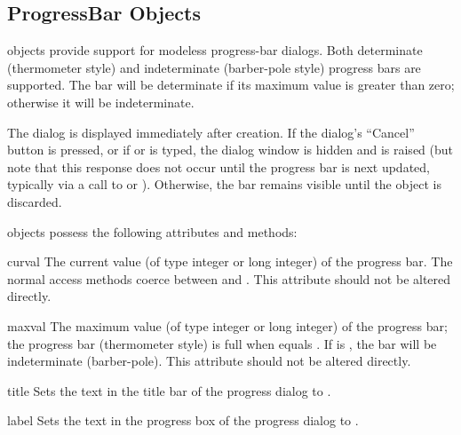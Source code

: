 \subsection{ProgressBar Objects \label{progressbar-objects}}

 objects provide support for modeless progress-bar
dialogs.  Both determinate (thermometer style) and indeterminate
(barber-pole style) progress bars are supported.  The bar will be
determinate if its maximum value is greater than zero; otherwise it
will be indeterminate.

The dialog is displayed immediately after creation. If the dialog's
``Cancel'' button is pressed, or if  or  is typed,
the dialog window is hidden and  is
raised (but note that this response does not occur until the progress
bar is next updated, typically via a call to  or
).  Otherwise, the bar remains visible until the
 object is discarded.

 objects possess the following attributes and
methods:

\begin{memberdesc}[ProgressBar]{curval}
The current value (of type integer or long integer) of the progress
bar.  The normal access methods coerce  between
 and .  This attribute should not be altered
directly.
\end{memberdesc}

\begin{memberdesc}[ProgressBar]{maxval}
The maximum value (of type integer or long integer) of the progress
bar; the progress bar (thermometer style) is full when 
equals .  If  is , the bar will
be indeterminate (barber-pole).  This attribute should not be altered
directly.
\end{memberdesc}

\begin{methoddesc}[ProgressBar]{title}{}
Sets the text in the title bar of the progress dialog to
.
\end{methoddesc}

\begin{methoddesc}[ProgressBar]{label}{}
Sets the text in the progress box of the progress dialog to
.
\end{methoddesc}


